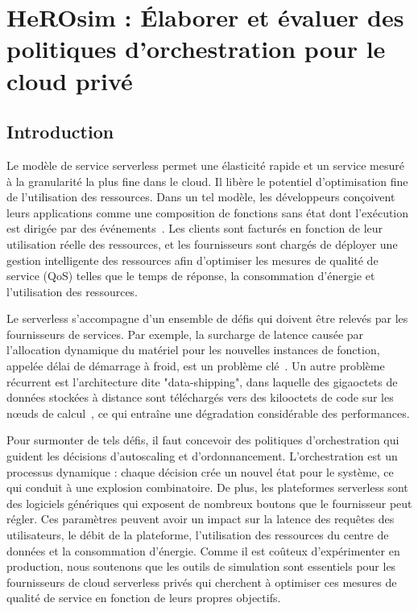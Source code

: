 \chapter{HeROsim : Élaborer et évaluer des politiques d'orchestration pour le cloud privé}

\section{Introduction}
\label{section:herosim-introduction}

Le modèle de service serverless permet une élasticité rapide et un service mesuré à la granularité la plus fine dans le cloud. Il libère le potentiel d'optimisation fine de l'utilisation des ressources. Dans un tel modèle, les développeurs conçoivent leurs applications comme une composition de fonctions sans état dont l'exécution est dirigée par des événements~\cite{SchleierSmith2021WhatSC}. 
Les clients sont facturés en fonction de leur utilisation réelle des ressources, et les fournisseurs sont chargés de déployer une gestion intelligente des ressources afin d'optimiser les mesures de qualité de service (QoS) telles que le temps de réponse, la consommation d'énergie et l'utilisation des ressources.

Le serverless s'accompagne d'un ensemble de défis qui doivent être relevés par les fournisseurs de services. Par exemple, la surcharge de latence causée par l'allocation dynamique du matériel pour les nouvelles instances de fonction, appelée délai de démarrage à froid, est un problème clé~\cite{Lannurien2023}. Un autre problème récurrent est l'architecture dite "data-shipping", dans laquelle des gigaoctets de données stockées à distance sont téléchargés vers des kilooctets de code sur les nœuds de calcul~\cite{yuFollowingDataNot}, ce qui entraîne une dégradation considérable des performances.

Pour surmonter de tels défis, il faut concevoir des politiques d'orchestration qui guident les décisions d'autoscaling et d'ordonnancement.
L'orchestration est un processus dynamique : chaque décision crée un nouvel état pour le système, ce qui conduit à une explosion combinatoire. De plus, les plateformes serverless sont des logiciels génériques qui exposent de nombreux boutons que le fournisseur peut régler. Ces paramètres peuvent avoir un impact sur la latence des requêtes des utilisateurs, le débit de la plateforme, l'utilisation des ressources du centre de données et la consommation d'énergie. Comme il est coûteux d'expérimenter en production, nous soutenons que les outils de simulation sont essentiels pour les fournisseurs de cloud serverless privés qui cherchent à optimiser ces mesures de qualité de service en fonction de leurs propres objectifs.

